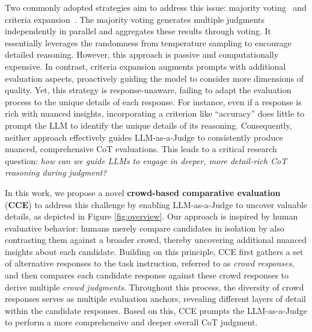 Two commonly adopted strategies aim to address this issue: majority voting~\citep{zhang2024generative,mahan2024generativerewardmodels,deepseekai2024deepseekv3technicalreport} and criteria expansion~\citep{kim2024prometheus,liu2024hd,hu2024llmevaluator}.
The majority voting generates multiple judgments independently in parallel and aggregates these results through voting.
It essentially leverages the randomness from temperature sampling to encourage detailed reasoning.
However, this approach is passive and computationally expensive.
In contrast, criteria expansion augments prompts with additional evaluation aspects, proactively guiding the model to consider more dimensions of quality.
Yet, this strategy is response-unaware, failing to adapt the evaluation process to the unique details of each response. For instance, even if a response is rich with nuanced insights, incorporating a criterion like ``accuracy'' does little to prompt the LLM to identify the unique details of its reasoning.
Consequently, neither approach effectively guides LLM-as-a-Judge to consistently produce nuanced, comprehensive CoT evaluations.
This leads to a critical research question: \textit{how can we guide LLMs to engage in deeper, more detail-rich CoT reasoning during judgment?}



In this work, we propose a novel \textbf{crowd-based comparative evaluation} (\textbf{\textsc{CCE}}) to address this challenge by enabling LLM-as-a-Judge to uncover valuable details, as depicted in Figure \ref{fig:overview}.
Our approach is inspired by human evaluative behavior: humans merely compare candidates in isolation by also contrasting them against a broader crowd, thereby uncovering additional nuanced insights about each candidate. Building on this principle, \textsc{CCE} first gathers a set of alternative responses to the task instruction, referred to as \textit{crowd responses}, and then compares each candidate response against these crowd responses to derive multiple \textit{crowd judgments}. Throughout this process, the diversity of crowd responses serves as multiple evaluation anchors, revealing different layers of detail within the candidate responses. Based on this, \textsc{CCE} prompts the LLM-as-a-Judge to perform a more comprehensive and deeper overall CoT judgment.






